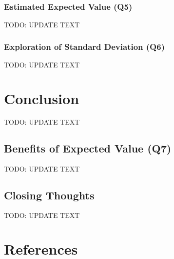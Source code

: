 \documentclass[
	letterpaper, %
]{jdf}
\begin{document}
\subsubsection{Estimated Expected Value (Q5)}
TODO: UPDATE TEXT

\subsubsection{Exploration of Standard Deviation (Q6)}
TODO: UPDATE TEXT

\section{Conclusion}
TODO: UPDATE TEXT

\subsection{Benefits of Expected Value (Q7)}
TODO: UPDATE TEXT

\subsection{Closing Thoughts}
TODO: UPDATE TEXT \citep{Martingale} \citep{Roulette}

\section{References}
\printbibliography[heading=none]
\end{document}
